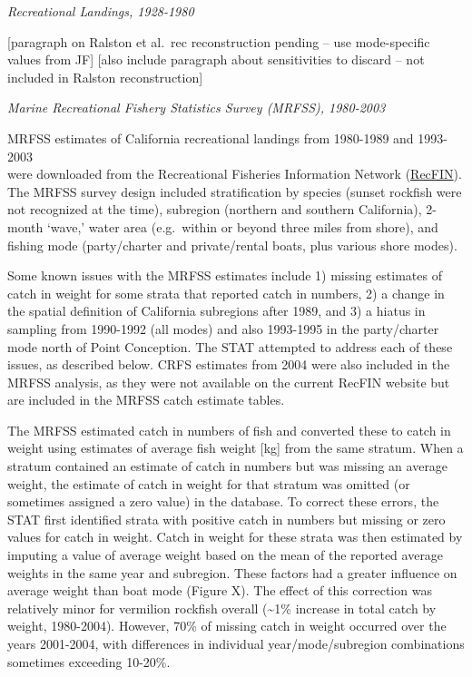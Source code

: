 \documentclass[11pt,
  english,
  a4paper,
]{article}
\begin{document}
\leavevmode\tagmcend\tagstructend

\emph{Recreational Landings, 1928-1980}

{[}paragraph on Ralston et al.~rec reconstruction pending -- use mode-specific values from JF{]} {[}also include paragraph about sensitivities to discard -- not included in Ralston reconstruction{]}

\emph{Marine Recreational Fishery Statistics Survey (MRFSS), 1980-2003}

MRFSS estimates of California recreational landings from 1980-1989 and 1993-2003\\
were downloaded from the Recreational Fisheries Information Network ({\href{https://www.recfin.org/}{RecFIN}\leavevmode\tagmcend\tagstructend}). The MRFSS survey design included stratification by species (sunset rockfish were not recognized at the time), subregion (northern and southern California), 2-month `wave,' water area (e.g.~within or beyond three miles from shore), and fishing mode (party/charter and private/rental boats, plus various shore modes).

Some known issues with the MRFSS estimates include 1) missing estimates of catch in weight for some strata that reported catch in numbers, 2) a change in the spatial definition of California subregions after 1989, and 3) a hiatus in sampling from 1990-1992 (all modes) and also 1993-1995 in the party/charter mode north of Point Conception. The STAT attempted to address each of these issues, as described below. CRFS estimates from 2004 were also included in the MRFSS analysis, as they were not available on the current RecFIN website but are included in the MRFSS catch estimate tables.

The MRFSS estimated catch in numbers of fish and converted these to catch in weight using estimates of average fish weight {[}kg{]} from the same stratum. When a stratum contained an estimate of catch in numbers but was missing an average weight, the estimate of catch in weight for that stratum was omitted (or sometimes assigned a zero value) in the database. To correct these errors, the STAT first identified strata with positive catch in numbers but missing or zero values for catch in weight. Catch in weight for these strata was then estimated by imputing a value of average weight based on the mean of the reported average weights in the same year and subregion. These factors had a greater influence on average weight than boat mode (Figure X). The effect of this correction was relatively minor for vermilion rockfish overall (\textasciitilde1\% increase in total catch by weight, 1980-2004). However, 70\% of missing catch in weight occurred over the years 2001-2004, with differences in individual year/mode/subregion combinations sometimes exceeding 10-20\%.
\end{document}
